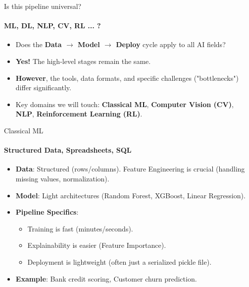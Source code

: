 \documentclass[aspectratio=169]{beamer}
\begin{document}
\begin{frame}[t]{Is this pipeline universal?}
    \framesubtitle{ML, DL, NLP, CV, RL ... ?}
    \begin{itemize}
        \item Does the \textbf{Data $\rightarrow$ Model $\rightarrow$ Deploy} cycle apply to all AI fields?
        \item \textbf{Yes!} The high-level stages remain the same.
        \item \textbf{However}, the tools, data formats, and specific challenges ("bottlenecks") differ significantly.
        \item Key domains we will touch: \textbf{Classical ML}, \textbf{Computer Vision (CV)}, \textbf{NLP}, \textbf{Reinforcement Learning (RL)}.
    \end{itemize}
\end{frame}

\begin{frame}[t]{Classical ML}
    \framesubtitle{Structured Data, Spreadsheets, SQL}
    \begin{itemize}
        \item \textbf{Data}: Structured (rows/columns). Feature Engineering is crucial (handling missing values, normalization).
        \item \textbf{Model}: Light architectures (Random Forest, XGBoost, Linear Regression).
        \item \textbf{Pipeline Specifics}:
            \begin{itemize}
                \item Training is fast (minutes/seconds).
                \item Explainability is easier (Feature Importance).
                \item Deployment is lightweight (often just a serialized pickle file).
            \end{itemize}
        \item \textbf{Example}: Bank credit scoring, Customer churn prediction.
    \end{itemize}
\end{frame}
\end{document}
